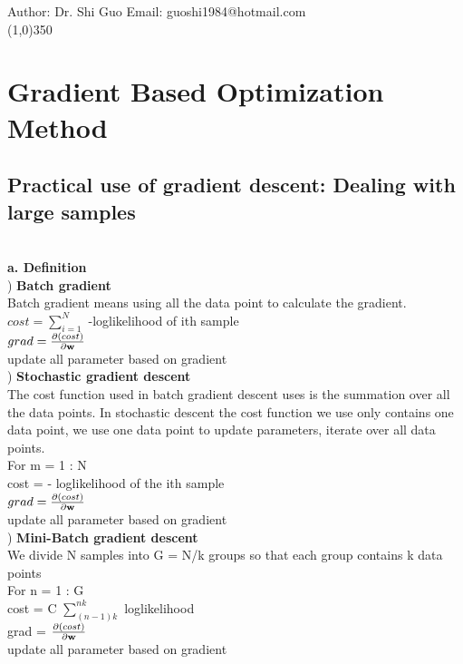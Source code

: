 \documentclass[a4paper]{article}
\begin{document}
Author: Dr. Shi Guo  \hspace{30mm} Email: guoshi1984@hotmail.com\\
\line(1,0){350}\\
\section{Gradient Based Optimization Method}
\subsection{Practical use of gradient descent: Dealing with large samples}
\\
{\bf a.	Definition}\\
) {\bf Batch gradient} \\
Batch gradient means using all the data point to calculate the gradient.\\
$cost = \sum_{i=1}^{N}$ -loglikelihood of ith sample\\
$grad = \frac{\partial(cost)}{\partial {\bf w}}$\\
update all parameter based on gradient\\

) {\bf Stochastic gradient descent}\\
The cost function used in batch gradient descent uses is the summation over all the data points. In stochastic descent the cost function we use only contains one data point, we use one data point to update parameters, iterate over all data points.\\
For m = 1 : N\\
\indent	cost = - loglikelihood of the ith sample\\
\indent  $grad = \frac{\partial(cost)}{\partial {\bf w}}$\\
update all parameter based on gradient\\

) {\bf Mini-Batch gradient descent} \\
We divide N samples into G = N/k groups so that each group contains k data points\\
For n = 1 : G\\
\indent cost = C $\sum_{(n-1)k} ^{nk}$ loglikelihood\\
\indent   grad = $\frac{\partial(cost)}{\partial {\bf w}}$ \\
update all parameter based on gradient\\
\end{document}
